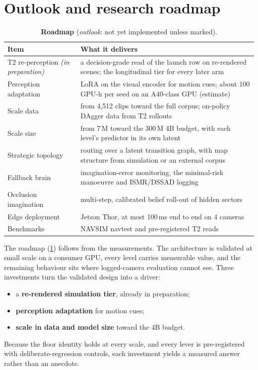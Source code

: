 \documentclass[10pt,twocolumn]{article}
\theoremstyle{remark}
\begin{document}
\section{Outlook and research roadmap}\label{sec:outlook}
\begin{table}[t]
\centering
\caption{\textbf{Roadmap} (\emph{outlook}: not yet implemented unless marked).}
\label{tab:roadmap}
\small
\begin{tabularx}{\columnwidth}{@{}>{\raggedright\arraybackslash}p{24mm}>{\raggedright\arraybackslash}X@{}}
\toprule
Item & What it delivers \\
\midrule
T2 re-perception \textit{(in preparation)} & a decision-grade read of the launch row on re-rendered scenes; the longitudinal tier for every later arm \\
Perception adaptation & LoRA on the visual encoder for motion cues; about 100 GPU-h per seed on an A40-class GPU (estimate) \\
Scale data & from 4,512 clips toward the full corpus; on-policy DAgger data from T2 rollouts \\
Scale size & from 7\,M toward the 300\,M 4B budget, with each level's predictor in its own latent \\
Strategic topology & routing over a latent transition graph, with map structure from simulation or an external corpus \\
Fallback brain & imagination-error monitoring, the minimal-risk manoeuvre and ISMR/DSSAD logging \\
Occlusion imagination & multi-step, calibrated belief roll-out of hidden sectors \\
Edge deployment & Jetson Thor, at most 100\,ms end to end on 4 cameras \\
Benchmarks & NAVSIM navtest and pre-registered T2 reads \\
\bottomrule
\end{tabularx}
\end{table}

The roadmap (\cref{tab:roadmap}) follows from the measurements. The architecture is validated at small scale on a consumer GPU,
every level carries measurable value, and the remaining behaviour sits where logged-camera evaluation cannot see. Three investments
turn the validated design into a driver:
\begin{itemize}
  \item a \textbf{re-rendered simulation tier}, already in preparation;
  \item \textbf{perception adaptation} for motion cues;
  \item \textbf{scale in data and model size} toward the 4B budget.
\end{itemize}
Because the floor identity holds at every scale, and every lever is pre-registered with deliberate-regression controls, each
investment yields a measured answer rather than an anecdote.
\end{document}
